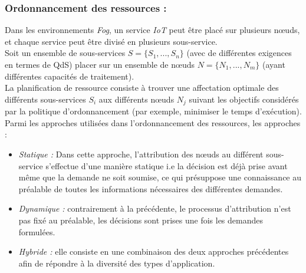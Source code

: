 \subsubsection{Ordonnancement des ressources :}
Dans les environnements \emph{Fog}, un service \emph{IoT} peut être placé sur plusieurs nœuds, et chaque service peut être divisé en plusieurs sous-service.\\ 
Soit un ensemble de sous-services $S=\{S_{1},...,S_{n}\}$ (avec de différentes exigences en termes de QdS) placer sur un ensemble de nœuds $N=\{N_{1},...,N_{m}\}$ (ayant différentes capacités de traitement).\\
La planification de ressource consiste à trouver une affectation optimale des différents sous-services $S_{i}$ aux différents nœuds $N_{j}$ suivant les objectifs considérés par la politique d'ordonnancement (par exemple, minimiser le temps d'exécution).\\
Parmi les approches utilisées dans l'ordonnancement des ressources, les approches : 
\begin{itemize}
  \item \emph{Statique :} Dans cette approche, l'attribution des nœuds au différent sous-service s'effectue d'une manière statique i.e la décision est déjà prise avant même que la demande ne soit soumise, ce qui présuppose une connaissance au préalable de toutes les informations nécessaires des différentes demandes.
  \item \emph{Dynamique :} contrairement à la précédente, le processus d'attribution  n'est pas fixé au préalable, les décisions sont prises une fois les demandes formulées.
  \item \emph{Hybride :} elle consiste en une combinaison des deux approches précédentes afin de répondre à la diversité des types d'application. 
\end{itemize}
